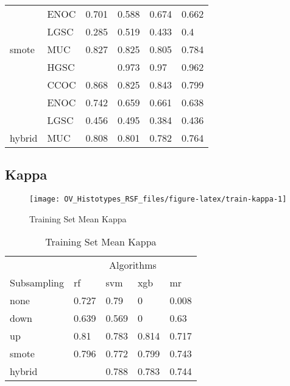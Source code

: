 \documentclass[
]{report}
\begin{document}
\begin{table}
\begin{tabular}[t]{l|l|l|l|l|l}
\cline{2-6}
 & ENOC & 0.701 & 0.588 & 0.674 & 0.662\\
\cline{2-6}
 & LGSC & 0.285 & 0.519 & 0.433 & 0.4\\
\cline{2-6}
\multirow{-5}{*}{\raggedright\arraybackslash smote} & MUC & 0.827 & 0.825 & 0.805 & 0.784\\
\cline{1-6}
 & HGSC & \cellcolor[HTML]{90ee90}{0.977} & 0.973 & 0.97 & 0.962\\
\cline{2-6}
 & CCOC & 0.868 & 0.825 & 0.843 & 0.799\\
\cline{2-6}
 & ENOC & 0.742 & 0.659 & 0.661 & 0.638\\
\cline{2-6}
 & LGSC & 0.456 & 0.495 & 0.384 & 0.436\\
\cline{2-6}
\multirow{-5}{*}{\raggedright\arraybackslash hybrid} & MUC & 0.808 & 0.801 & 0.782 & 0.764\\
\hline
\end{tabular}
\end{table}

\hypertarget{kappa-1}{%
\subsection{Kappa}\label{kappa-1}}

\begin{figure}[H]

{\centering \texttt{[image: OV\_Histotypes\_RSF\_files/figure-latex/train-kappa-1]} 

}

\caption{Training Set Mean Kappa}\label{fig:train-kappa}
\end{figure}

\begin{table}

\caption{\label{tab:train-kappa-table}Training Set Mean Kappa}
\centering
\begin{tabular}[t]{l|l|l|l|l}
\hline
\multicolumn{1}{c|}{ } & \multicolumn{4}{c}{Algorithms} \\
\cline{2-5}
Subsampling & rf & svm & xgb & mr\\
\hline
none & 0.727 & 0.79 & 0 & 0.008\\
\hline
down & 0.639 & 0.569 & 0 & 0.63\\
\hline
up & 0.81 & 0.783 & 0.814 & 0.717\\
\hline
smote & 0.796 & 0.772 & 0.799 & 0.743\\
\hline
hybrid & \cellcolor[HTML]{90ee90}{0.819} & 0.788 & 0.783 & 0.744\\
\hline
\end{tabular}
\end{table}
\end{document}
